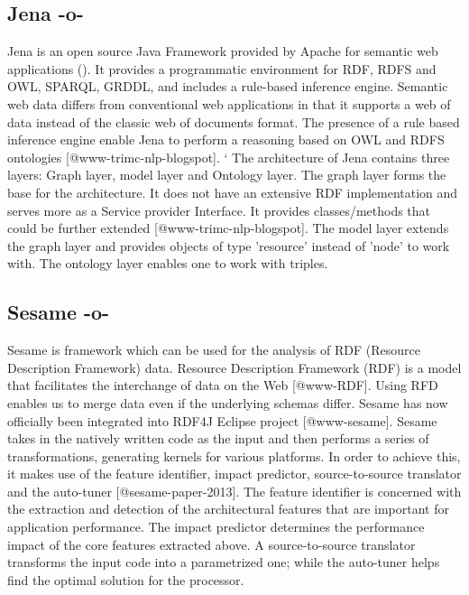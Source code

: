 \subsection{Jena -o-}

Jena is an open source Java Framework provided by Apache for semantic
web applications (\cite{www-w3-jena}). It provides a programmatic
environment for RDF, RDFS and OWL, SPARQL, GRDDL, and includes a
rule-based inference engine. Semantic web data differs from
conventional web applications in that it supports a web of data
instead of the classic web of documents format. The presence of a rule
based inference engine enable Jena to perform a reasoning based on OWL
and RDFS ontologies [@www-trimc-nlp-blogspot]. ` The architecture
of Jena contains three layers: Graph layer, model layer and Ontology
layer. The graph layer forms the base for the architecture. It does
not have an extensive RDF implementation and serves more as a Service
provider Interface. It provides classes/methods that could be further
extended [@www-trimc-nlp-blogspot].  The model layer extends the
graph layer and provides objects of type 'resource' instead of 'node'
to work with.  The ontology layer enables one to work with triples.



\subsection{Sesame -o-}

Sesame is framework which can be used for the analysis of RDF
(Resource Description Framework) data.  Resource Description Framework
(RDF) is a model that facilitates the interchange of data on the
Web [@www-RDF].  Using RFD enables us to merge data even if the
underlying schemas differ.  Sesame has now officially been integrated
into RDF4J Eclipse project [@www-sesame].  Sesame takes in the
natively written code as the input and then performs a series of
transformations, generating kernels for various platforms.  In order
to achieve this, it makes use of the feature identifier, impact
predictor, source-to-source translator and the
auto-tuner [@sesame-paper-2013].  The feature identifier is
concerned with the extraction and detection of the architectural
features that are important for application performance.  The impact
predictor determines the performance impact of the core features
extracted above.  A source-to-source translator transforms the input
code into a parametrized one; while the auto-tuner helps find the
optimal solution for the processor.


